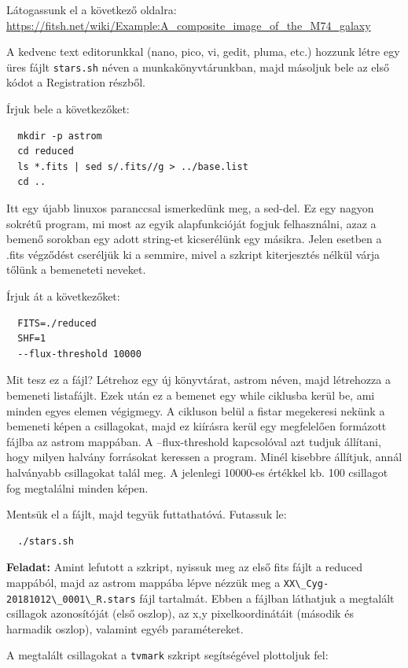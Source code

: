 \documentclass{article}
\begin{document}
Látogassunk el a következő oldalra:
\url{https://fitsh.net/wiki/Example:A_composite_image_of_the_M74_galaxy}

A kedvenc text editorunkkal (nano, pico, vi, gedit, pluma, etc.) hozzunk létre
egy üres fájlt \verb+stars.sh+ néven a munkakönyvtárunkban, majd másoljuk bele az első
kódot a Registration részből.

Írjuk bele a következőket:
\begin{verbatim}
  mkdir -p astrom
  cd reduced
  ls *.fits | sed s/.fits//g > ../base.list
  cd ..
\end{verbatim}

Itt egy újabb linuxos paranccsal ismerkedünk meg, a sed-del. Ez egy nagyon
sokrétű program, mi most az egyik alapfunkcióját fogjuk felhasználni, azaz a
bemenő sorokban egy adott string-et kicserélünk egy másikra. Jelen esetben a
.fits végződést cseréljük ki a semmire, mivel a szkript kiterjesztés nélkül
várja tőlünk a bemeneteti neveket.

Írjuk át a következőket:
\begin{verbatim}
  FITS=./reduced
  SHF=1
  --flux-threshold 10000
\end{verbatim}

Mit tesz ez a fájl? Létrehoz egy új könyvtárat, astrom néven, majd létrehozza a
bemeneti listafájlt. Ezek után ez a bemenet egy while ciklusba kerül be, ami
minden egyes elemen végigmegy. A cikluson belül a fistar megekeresi nekünk a
bemeneti képen a csillagokat, majd ez kiírásra kerül egy megfelelően formázott
fájlba az astrom mappában.
A --flux-threshold kapcsolóval azt tudjuk állítani, hogy milyen halvány
forrásokat keressen a program. Minél kisebbre  állítjuk, annál halványabb
csillagokat talál meg. A jelenlegi 10000-es értékkel kb. 100 csillagot fog
megtalálni minden képen.

Mentsük el a fájlt, majd tegyük futtathatóvá. Futassuk le:

\begin{verbatim}
  ./stars.sh
\end{verbatim}

{\bf Feladat:}
Amint lefutott a szkript, nyissuk meg az első fits fájlt a reduced mappából,
majd az astrom mappába lépve nézzük meg a \verb+XX\_Cyg-20181012\_0001\_R.stars+ fájl
tartalmát. Ebben a fájlban láthatjuk a megtalált csillagok azonosítóját (első
oszlop), az x,y pixelkoordinátáit (második és harmadik oszlop), valamint
egyéb paramétereket.

A megtalált csillagokat a \verb+tvmark+ szkript segítségével plottoljuk fel:
\end{document}
